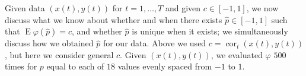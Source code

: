 \documentclass[letterpaper,12pt]{article}
\newcommand{\E}{\operatorname{E}}
\newcommand{\cor}{\operatorname{cor}}
\begin{document}
Given data $(x(t),y(t))$ for $t=1,\ldots,T$ and given $c \in [-1,1]$,
we now discuss what we know about whether and when there exists $\hat{p} \in [-1,1]$ such 
that $\E\varphi(\hat{p})=c$, and whether $\hat{p}$ is unique when it 
exists; we simultaneously discuss how we obtained $\hat{p}$ for our data.
Above we used $c=\cor_t(x(t),y(t))$, but here we consider general $c$. 
Given $(x(t),y(t))$, we evaluated $\varphi$ $500$ times for $p$ equal to each
of $18$ values evenly spaced from $-1$ to $1$. 
\end{document}
